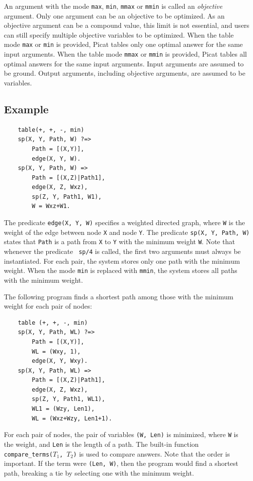 An argument with the mode \texttt{max}, \texttt{min}, \texttt{mmax} or \texttt{mmin} is called an \emph{objective} argument. Only one argument can be an objective to be optimized. As an objective argument can be a compound value, this limit is not essential, and users can still specify multiple objective variables to be optimized. When the table mode \texttt{max} or \texttt{min} is provided, Picat tables only one optimal answer for the same input arguments. When the table mode \texttt{mmax} or \texttt{mmin} is provided, Picat tables all optimal answers for the same input arguments. Input arguments are assumed to be ground.  Output arguments, including objective arguments, are assumed to be variables. 

\subsection*{Example}
\begin{verbatim}
    table(+, +, -, min)
    sp(X, Y, Path, W) ?=>
        Path = [(X,Y)],
        edge(X, Y, W).
    sp(X, Y, Path, W) =>
        Path = [(X,Z)|Path1],
        edge(X, Z, Wxz),
        sp(Z, Y, Path1, W1),
        W = Wxz+W1.
\end{verbatim}
The predicate \texttt{edge(X, Y, W)} specifies a weighted directed graph, where \texttt{W} is the weight of the edge between node \texttt{X} and node \texttt{Y}. The predicate \texttt{sp(X, Y, Path, W)} states that \texttt{Path} is a path from \texttt{X} to \texttt{Y} with the minimum weight \texttt{W}. Note that whenever the predicate \texttt{ sp/4} is called, the first two arguments must always be instantiated. For each pair, the system stores only one path with the minimum weight. When the mode \texttt{min} is replaced with \texttt{mmin}, the system stores all paths with the minimum weight.

The following program finds a shortest path among those with the minimum weight for each pair of nodes:
\begin{verbatim}
    table (+, +, -, min)
    sp(X, Y, Path, WL) ?=>
        Path = [(X,Y)],
        WL = (Wxy, 1),
        edge(X, Y, Wxy).
    sp(X, Y, Path, WL) =>
        Path = [(X,Z)|Path1],
        edge(X, Z, Wxz),
        sp(Z, Y, Path1, WL1),
        WL1 = (Wzy, Len1),
        WL = (Wxz+Wzy, Len1+1).
\end{verbatim}
For each pair of nodes, the pair of variables \texttt{(W, Len)} is minimized, where \texttt{W} is the weight, and \texttt{Len} is the length of a path. The built-in function \texttt{compare\_terms($T_1$, $T_2$)} is used to compare answers. Note that the order is important. If the term were \texttt{(Len, W)}, then the program would find a shortest path, breaking a tie by selecting one with the minimum weight.

